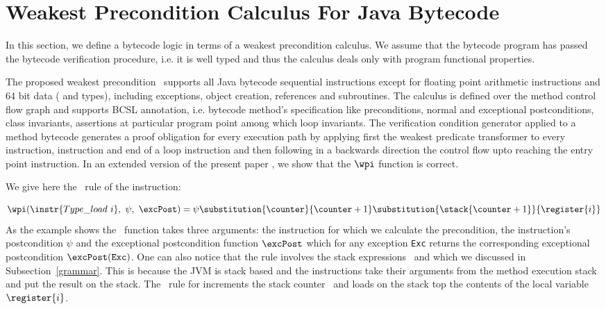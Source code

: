 
\section{Weakest Precondition Calculus For Java Bytecode}\label{wpbc}
In this section, we define a bytecode logic in terms of a weakest precondition calculus.
We assume that the bytecode program has passed the bytecode verification procedure, i.e. it is well typed and
 thus the calculus deals only with program functional properties. 

The proposed weakest precondition \wpi \ supports all Java bytecode sequential instructions except for floating point
 arithmetic instructions and 64 bit data ( and  types), including exceptions, object creation,
 references and subroutines. The calculus is defined over the method control flow graph and supports BCSL annotation,
 i.e. bytecode method's specification like preconditions, normal and exceptional postconditions, class invariants,
 assertions at particular program point among which loop invariants. The verification condition generator applied to a method 
bytecode generates a proof obligation for every execution path
 by applying first the weakest predicate transformer to every  instruction,
  instruction and end of a loop instruction and then following in a backwards direction the control
 flow upto reaching the entry point instruction.
 In an extended version of the present paper \cite{JBL05MP}, we show that the $\wpi$ function is correct.

We give here the \wpi \ rule of the   instruction:

\[\wpi(\instr{Type\_load \ i}, \ \psi, \ \excPost) = \psi\substitution{\counter }{\counter+1} \substitution{\stack{\counter+1}}{\register{i}}
\] 
 As the example shows the \wpi \ function takes three arguments:
the instruction for which we calculate the precondition, 
the instruction's postcondition $\psi$ and the exceptional postcondition function $\excPost$ which for any exception \texttt{Exc} returns the
corresponding exceptional postcondition $\excPost(\texttt{Exc})$. One can also notice that the rule involves the stack expressions \counter \ and \stack{\counter} which we discussed in Subsection~\ref{grammar}.
 This is because the JVM is stack based and the instructions take their arguments from the method execution stack and 
 put the result on the stack.
 The \wpi \ rule for   increments the stack counter \counter \ and loads on the stack top the contents
 of the local variable $\register{i}$. 




